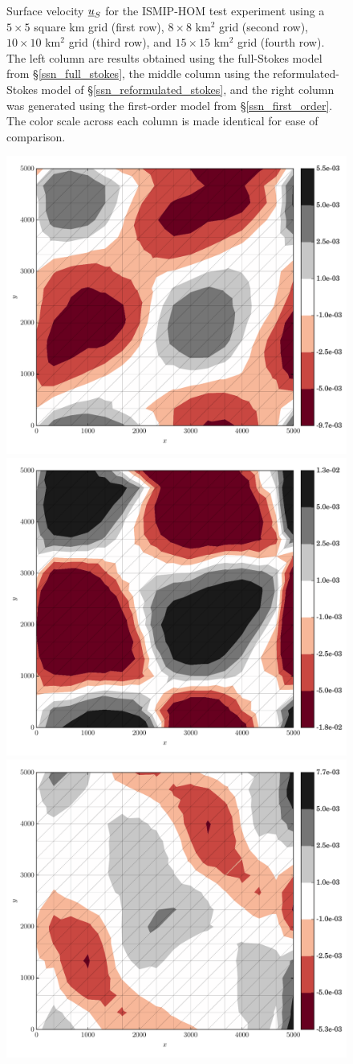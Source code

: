 \begin{figure}
  \caption[ISMIP-HOM momentum experiment velocities]{Surface velocity $\underline{u}_S$ for the ISMIP-HOM test experiment using a $5 \times 5$ square km grid (first row), $8 \times 8$ km$^2$ grid (second row), $10 \times 10$ km$^2$ grid (third row), and $15 \times 15$ km$^2$ grid (fourth row).  The left column are results obtained using the full-Stokes model from \S \ref{ssn_full_stokes}, the middle column using the reformulated-Stokes model of \S \ref{ssn_reformulated_stokes}, and the right column was generated using the first-order model from \S \ref{ssn_first_order}. The color scale across each column is made identical for ease of comparison. \newline}
  \label{ismip_hom_a_velocity}
\end{figure}

\begin{figure}
  \centering

    \includegraphics[width=0.3\linewidth]{images/momentum/ISMIP_HOM_A/xsmall/FS/divU.pdf}
    \quad                                           
    \includegraphics[width=0.3\linewidth]{images/momentum/ISMIP_HOM_A/xsmall/RS/divU.pdf}
    \quad                                           
    \includegraphics[width=0.3\linewidth]{images/momentum/ISMIP_HOM_A/xsmall/BP/divU.pdf}
                                                    

\end{figure}

